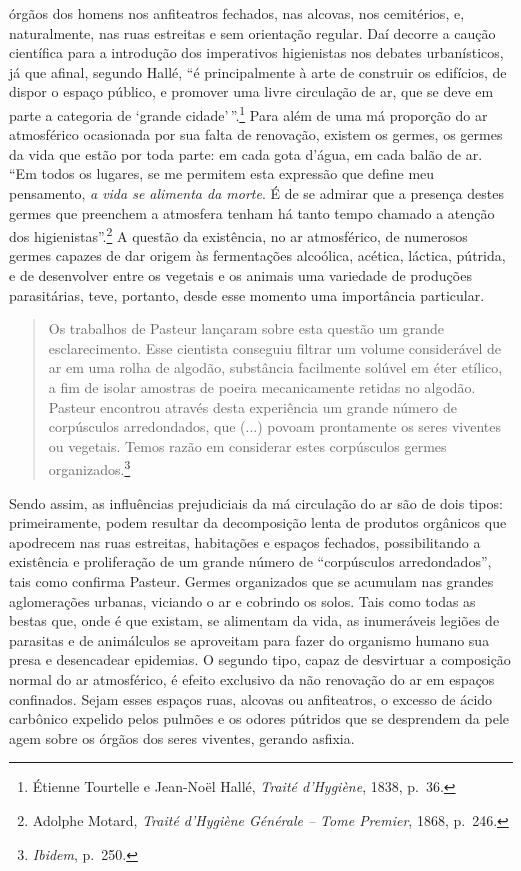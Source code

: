 órgãos dos homens nos anfiteatros fechados, nas alcovas, nos cemitérios,
e, naturalmente, nas ruas estreitas e sem orientação regular. Daí
decorre a caução científica para a introdução dos imperativos
higienistas nos debates urbanísticos, já que afinal, segundo Hallé, ``é
principalmente à arte de construir os edifícios, de dispor o espaço
público, e promover uma livre circulação de ar, que se deve em parte a
categoria de `grande cidade'\,''.\footnote{Étienne Tourtelle e Jean-Noël
  Hallé, \emph{Traité d'Hygiène}, 1838, p.~36.} Para além de uma má
proporção do ar atmosférico ocasionada por sua falta de renovação,
existem os germes, os germes da vida que estão por toda parte: em cada
gota d'água, em cada balão de ar. ``Em todos os lugares, se me permitem
esta expressão que define meu pensamento, \emph{a vida se alimenta da
morte}. É de se admirar que a presença destes germes que preenchem a
atmosfera tenham há tanto tempo chamado a atenção dos
higienistas''.\footnote{Adolphe Motard, \emph{Traité d'Hygiène Générale
  -- Tome Premier}, 1868, p.~246.} A questão da existência, no ar
atmosférico, de numerosos germes capazes de dar origem às fermentações
alcoólica, acética, láctica, pútrida, e de desenvolver entre os vegetais
e os animais uma variedade de produções parasitárias, teve, portanto,
desde esse momento uma importância particular.

\begin{quote}
Os trabalhos de Pasteur lançaram sobre esta questão um grande
esclarecimento. Esse cientista conseguiu filtrar um volume considerável
de ar em uma rolha de algodão, substância facilmente solúvel em éter
etílico, a fim de isolar amostras de poeira mecanicamente retidas no
algodão. Pasteur encontrou através desta experiência um grande número de
corpúsculos arredondados, que (...) povoam prontamente os seres viventes
ou vegetais. Temos razão em considerar estes corpúsculos germes
organizados.\footnote{\emph{Ibidem}, p.~250.}
\end{quote}

Sendo assim, as influências prejudiciais da má circulação do ar são de
dois tipos: primeiramente, podem resultar da decomposição lenta de
produtos orgânicos que apodrecem nas ruas estreitas, habitações e
espaços fechados, possibilitando a existência e proliferação de um
grande número de ``corpúsculos arredondados'', tais como confirma
Pasteur. Germes organizados que se acumulam nas grandes aglomerações
urbanas, viciando o ar e cobrindo os solos. Tais como todas as bestas
que, onde é que existam, se alimentam da vida, as inumeráveis legiões de
parasitas e de animálculos se aproveitam para fazer do organismo humano
sua presa e desencadear epidemias. O segundo tipo, capaz de desvirtuar a
composição normal do ar atmosférico, é efeito exclusivo da não renovação
do ar em espaços confinados. Sejam esses espaços ruas, alcovas ou
anfiteatros, o excesso de ácido carbônico expelido pelos pulmões e os
odores pútridos que se desprendem da pele agem sobre os órgãos dos seres
viventes, gerando asfixia.

